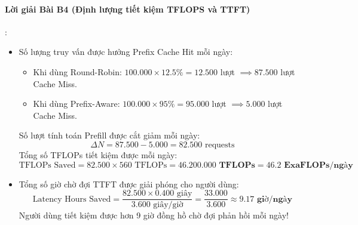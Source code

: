 \paragraph{Lời giải Bài B4 (Định lượng tiết kiệm TFLOPS và TTFT)}:
\begin{itemize}
  \item[a)] Số lượng truy vấn được hưởng Prefix Cache Hit mỗi ngày:
  \begin{itemize}
    \item Khi dùng Round-Robin: $100.000 \times 12.5\% = 12.500$ lượt $\implies 87.500$ lượt Cache Miss.
    \item Khi dùng Prefix-Aware: $100.000 \times 95\% = 95.000$ lượt $\implies 5.000$ lượt Cache Miss.
  \end{itemize}
  Số lượt tính toán Prefill được cắt giảm mỗi ngày:
  \begin{equation*}
  \Delta N = 87.500 - 5.000 = 82.500 \text{ requests}
  \end{equation*}
  Tổng số TFLOPs tiết kiệm được mỗi ngày:
  \begin{equation*}
  \text{TFLOPs Saved} = 82.500 \times 560\text{ TFLOPs} = \mathbf{46.200.000\text{ TFLOPs}} = \mathbf{46.2\text{ ExaFLOPs/ngày}}
  \end{equation*}

  \item[b)] Tổng số giờ chờ đợi TTFT được giải phóng cho người dùng:
  \begin{equation*}
  \text{Latency Hours Saved} = \frac{82.500 \times 0.400\text{ giây}}{3.600\text{ giây/giờ}} = \frac{33.000}{3.600} \approx \mathbf{9.17\text{ giờ/ngày}}
  \end{equation*}
  Người dùng tiết kiệm được hơn 9 giờ đồng hồ chờ đợi phản hồi mỗi ngày!
\end{itemize}

